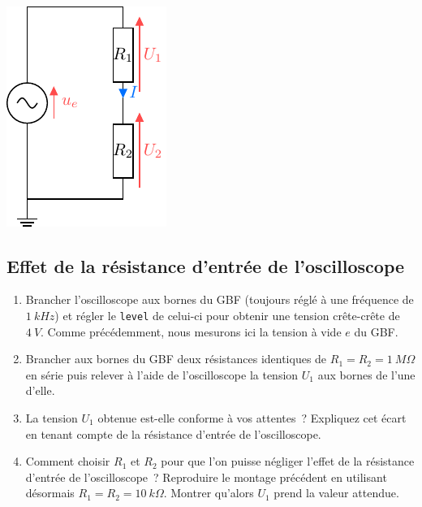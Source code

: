 \documentclass[../main/main.tex]{subfiles}
\begin{document}
\begin{minipage}[t]{.35\linewidth}
	~
	\vspace{-20pt}
	\begin{center}
		\includegraphics[width=.8\linewidth]{divis_tension}
	\end{center}
\end{minipage}

\subsection{Effet de la résistance d'entrée de l'oscilloscope}

\begin{enumerate}[label=\sqenumi, start=15]
	\item Brancher l'oscilloscope aux bornes du GBF (toujours réglé à une
	      fréquence de $\SI{1}{kHz}$) et régler le \texttt{level} de celui-ci
	      pour obtenir une tension crête-crête de $\SI{4}{V}$. Comme précédemment,
	      nous mesurons ici la tension à vide $e$ du GBF.
	\item Brancher aux bornes du GBF deux résistances identiques de $R_1 = R_2 =
		      \SI{1}{M\Omega}$ en série puis relever à l'aide de l'oscilloscope la
	      tension $U_1$ aux bornes de l'une d'elle.
	\item La tension $U_1$ obtenue est-elle conforme à vos attentes~? Expliquez
	      cet écart en tenant compte de la résistance d'entrée de l'oscilloscope.
	\item Comment choisir $R_1$ et $R_2$ pour que l'on puisse négliger l'effet
	      de la résistance d'entrée de l'oscilloscope~? Reproduire le montage
	      précédent en utilisant désormais $R_1 = R_2 = \SI{10}{k\Omega}$. Montrer
	      qu'alors $U_1$ prend la valeur attendue.
\end{enumerate}
\end{document}
